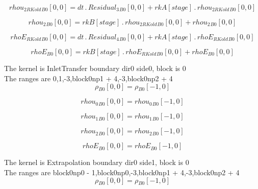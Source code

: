 \documentclass{article}
\begin{document}
\begin{dmath}{rhou_{2 RKold}{_{B0}}}[{0,0}] = dt \,.\, {Residual_{3}{_{B0}}}[{0,0}] + {rkA}[{stage}] \,.\, {rhou_{2 RKold}{_{B0}}}[{0,0}]\end{dmath}

\begin{dmath}{rhou_{2}{_{B0}}}[{0,0}] = {rkB}[{stage}] \,.\, {rhou_{2 RKold}{_{B0}}}[{0,0}] + {rhou_{2}{_{B0}}}[{0,0}]\end{dmath}

\begin{dmath}{rhoE_{RKold}{_{B0}}}[{0,0}] = dt \,.\, {Residual_{4}{_{B0}}}[{0,0}] + {rkA}[{stage}] \,.\, {rhoE_{RKold}{_{B0}}}[{0,0}]\end{dmath}

\begin{dmath}{rhoE{_{B0}}}[{0,0}] = {rkB}[{stage}] \,.\, {rhoE_{RKold}{_{B0}}}[{0,0}] + {rhoE{_{B0}}}[{0,0}]\end{dmath}

\noindent The kernel is InletTransfer boundary dir0 side0, block is 0\\\noindent The ranges are 0,1,-3,block0np1 + 4,-3,block0np2 + 4\\\begin{dmath}{\rho{_{B0}}}[{0,0}] = {\rho{_{B0}}}[{-1,0}]\end{dmath}

\begin{dmath}{rhou_{0}{_{B0}}}[{0,0}] = {rhou_{0}{_{B0}}}[{-1,0}]\end{dmath}

\begin{dmath}{rhou_{1}{_{B0}}}[{0,0}] = {rhou_{1}{_{B0}}}[{-1,0}]\end{dmath}

\begin{dmath}{rhou_{2}{_{B0}}}[{0,0}] = {rhou_{2}{_{B0}}}[{-1,0}]\end{dmath}

\begin{dmath}{rhoE{_{B0}}}[{0,0}] = {rhoE{_{B0}}}[{-1,0}]\end{dmath}

\noindent The kernel is Extrapolation boundary dir0 side1, block is 0\\\noindent The ranges are block0np0 - 1,block0np0,-3,block0np1 + 4,-3,block0np2 + 4\\\begin{dmath}{\rho{_{B0}}}[{0,0}] = {\rho{_{B0}}}[{-1,0}]\end{dmath}
\end{document}
